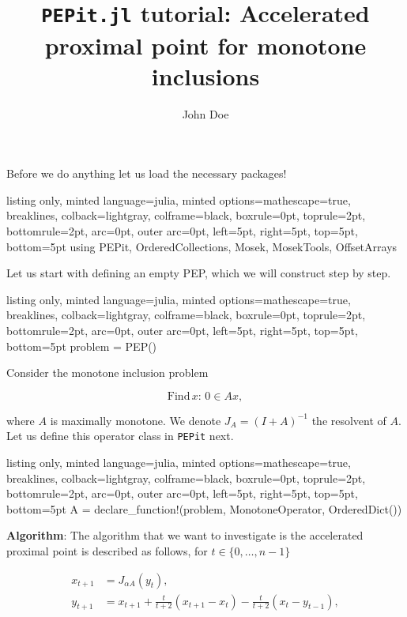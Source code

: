 \documentclass{article}
\title{\textbf{\textsf{\texttt{PEPit.jl} tutorial: Accelerated proximal point for monotone inclusions}}}
\author{John Doe}
\begin{document}
    \maketitle
    
    

Before we do anything let us load the necessary packages!

\begin{tcblisting}{listing only, minted language=julia, minted options={mathescape=true, breaklines}, colback=lightgray, colframe=black, boxrule=0pt, toprule=2pt, bottomrule=2pt, arc=0pt, outer arc=0pt, left=5pt, right=5pt, top=5pt, bottom=5pt}
using PEPit, OrderedCollections, Mosek, MosekTools, OffsetArrays
\end{tcblisting}


Let us start with defining an empty PEP, which we will construct step by step.

\begin{tcblisting}{listing only, minted language=julia, minted options={mathescape=true, breaklines}, colback=lightgray, colframe=black, boxrule=0pt, toprule=2pt, bottomrule=2pt, arc=0pt, outer arc=0pt, left=5pt, right=5pt, top=5pt, bottom=5pt}
problem = PEP()
\end{tcblisting}


Consider the monotone inclusion problem

\begin{equation*}
\mathrm{Find}\, x:\, 0\in Ax,
\end{equation*}

where $A$ is maximally monotone. We denote $J_A = (I + A)^{-1}$ the resolvent of $A$. Let us define this operator class in \texttt{PEPit} next.

\begin{tcblisting}{listing only, minted language=julia, minted options={mathescape=true, breaklines}, colback=lightgray, colframe=black, boxrule=0pt, toprule=2pt, bottomrule=2pt, arc=0pt, outer arc=0pt, left=5pt, right=5pt, top=5pt, bottom=5pt}
A = declare_function!(problem, MonotoneOperator, OrderedDict())
\end{tcblisting}


\textbf{Algorithm}: The algorithm that we want to investigate is the accelerated proximal point is described as follows, for $t \in \{ 0, \dots, n-1\}$

\begin{equation*}
\begin{aligned}
    x_{t+1} &= J_{\alpha A}(y_t), \\
    y_{t+1} &= x_{t+1} + \frac{t}{t+2}(x_{t+1} - x_{t}) - \frac{t}{t+2}(x_t - y_{t-1}),
\end{aligned}
\end{equation*}
\end{document}
